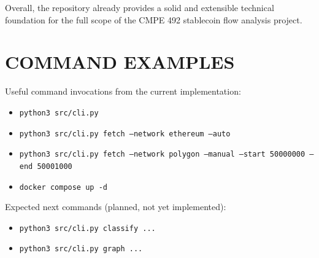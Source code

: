 \documentclass[a4paper,12pt]{report}
\begin{document}
Overall, the repository already provides a solid and extensible technical foundation for the full
scope of the CMPE 492 stablecoin flow analysis project.




\appendix	
\chapter{COMMAND EXAMPLES}
Useful command invocations from the current implementation:

\begin{itemize}
\item \texttt{python3 src/cli.py}
\item \texttt{python3 src/cli.py fetch --network ethereum --auto}
\item \texttt{python3 src/cli.py fetch --network polygon --manual --start 50000000 --end 50001000}
\item \texttt{docker compose up -d}
\end{itemize}

Expected next commands (planned, not yet implemented):
\begin{itemize}
\item \texttt{python3 src/cli.py classify ...}
\item \texttt{python3 src/cli.py graph ...}
\end{itemize}
\end{document}

